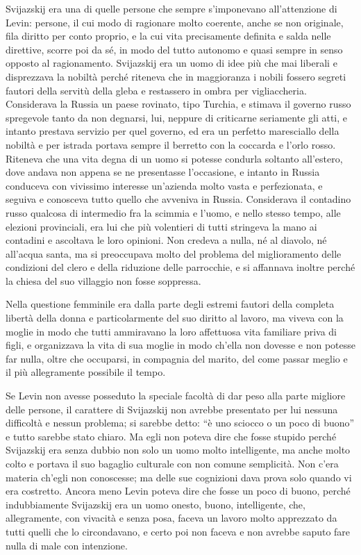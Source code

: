 Svijazskij era una di quelle persone che sempre s'imponevano all'attenzione di Levin: persone, il cui modo di ragionare molto coerente, anche se non originale, fila diritto per conto proprio, e la cui vita precisamente definita e salda nelle direttive, scorre poi da sé, in modo del tutto autonomo e quasi sempre in senso opposto al ragionamento. Svijazskij era un uomo di idee più che mai liberali e disprezzava la nobiltà perché riteneva che in maggioranza i nobili fossero segreti fautori della servitù della gleba e restassero in ombra per vigliaccheria. Considerava la Russia un paese rovinato, tipo Turchia, e stimava il governo russo spregevole tanto da non degnarsi, lui, neppure di criticarne seriamente gli atti, e intanto prestava servizio per quel governo, ed era un perfetto maresciallo della nobiltà e per istrada portava sempre il berretto con la coccarda e l'orlo rosso. Riteneva che una vita degna di un uomo si potesse condurla soltanto all'estero, dove andava non appena se ne presentasse l'occasione, e intanto in Russia conduceva con vivissimo interesse un'azienda molto vasta e perfezionata, e seguiva e conosceva tutto quello che avveniva in Russia. Considerava il contadino russo qualcosa di intermedio fra la scimmia e l'uomo, e nello stesso tempo, alle elezioni provinciali, era lui che più volentieri di tutti stringeva la mano ai contadini e ascoltava le loro opinioni. Non credeva a nulla, né al diavolo, né all'acqua santa, ma si preoccupava molto del problema del miglioramento delle condizioni del clero e della riduzione delle parrocchie, e si affannava inoltre perché la chiesa del suo villaggio non fosse soppressa. 

Nella questione femminile era dalla parte degli estremi fautori della completa libertà della donna e particolarmente del suo diritto al lavoro, ma viveva con la moglie in modo che tutti ammiravano la loro affettuosa vita familiare priva di figli, e organizzava la vita di sua moglie in modo ch'ella non dovesse e non potesse far nulla, oltre che occuparsi, in compagnia del marito, del come passar meglio e il più allegramente possibile il tempo. 

Se Levin non avesse posseduto la speciale facoltà di dar peso alla parte migliore delle persone, il carattere di Svijazskij non avrebbe presentato per lui nessuna difficoltà e nessun problema; si sarebbe detto: ``è uno sciocco o un poco di buono'' e tutto sarebbe stato chiaro. Ma egli non poteva dire che fosse stupido perché Svijazskij era senza dubbio non solo un uomo molto intelligente, ma anche molto colto e portava il suo bagaglio culturale con non comune semplicità. Non c'era materia ch'egli non conoscesse; ma delle sue cognizioni dava prova solo quando vi era costretto. Ancora meno Levin poteva dire che fosse un poco di buono, perché indubbiamente Svijazskij era un uomo onesto, buono, intelligente, che, allegramente, con vivacità e senza posa, faceva un lavoro molto apprezzato da tutti quelli che lo circondavano, e certo poi non faceva e non avrebbe saputo fare nulla di male con intenzione. 

